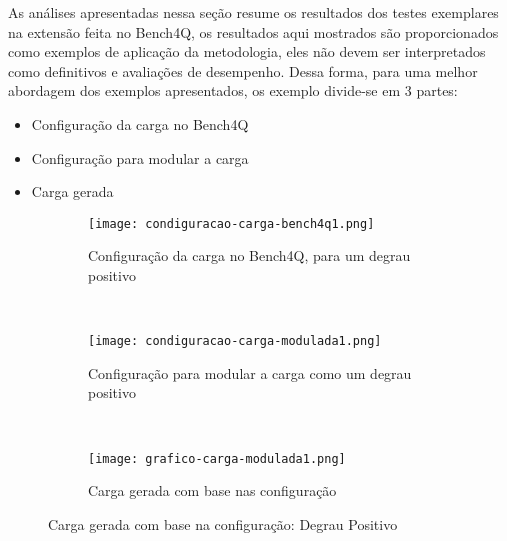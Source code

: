 As análises apresentadas nessa seção resume os resultados dos testes exemplares na extensão feita no Bench4Q, os resultados aqui mostrados são proporcionados como exemplos de aplicação da metodologia, eles não devem ser interpretados como definitivos e avaliações de desempenho. Dessa forma, para uma melhor abordagem dos exemplos apresentados, os exemplo divide-se em 3 partes:
\begin{itemize}
	\item Configuração da carga no Bench4Q
	\item Configuração para modular a carga
	\item Carga gerada
\end{itemize}

\begin{figure}[!htb]
	\begin{subfigure}{\linewidth}
		\centering
		\texttt{[image: condiguracao-carga-bench4q1.png]}
		\caption{Configuração da carga no Bench4Q, para um degrau positivo}
		\label{fig:condiguracao-carga-bench4q1}
	\end{subfigure}\\
	\begin{subfigure}{\linewidth}
		\centering
		\texttt{[image: condiguracao-carga-modulada1.png]}
		\caption{Configuração para modular a carga como um degrau positivo}
		\label{fig:condiguracao-carga-modulada1}
	\end{subfigure}\\[1ex]
	\begin{subfigure}{\linewidth}
		\centering
		\texttt{[image: grafico-carga-modulada1.png]}
		\caption{Carga gerada com base nas configuração}
		\label{fig:grafico-carga-modulada1}
	\end{subfigure}
	\caption{Carga gerada com base na configuração: Degrau Positivo}
	\label{fig:carga-modulada1}
	\fautor
\end{figure}

